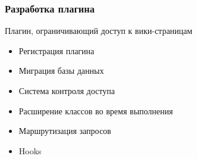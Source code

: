 \documentclass[unicode]{beamer}
\begin{document}
\begin{frame}
\transwipe[direction=90]
\frametitle{Разработка плагина}
\begin{block}{Плагин, ограничивающий доступ к вики-страницам}
\begin{itemize}
  \item Регистрация плагина
  \item Миграция базы данных
  \item Система контроля доступа
  \item Расширение классов во время выполнения
  \item Маршрутизация запросов
  \item Hooks
\end{itemize}
\end{block}
\end{frame}
\end{document}
